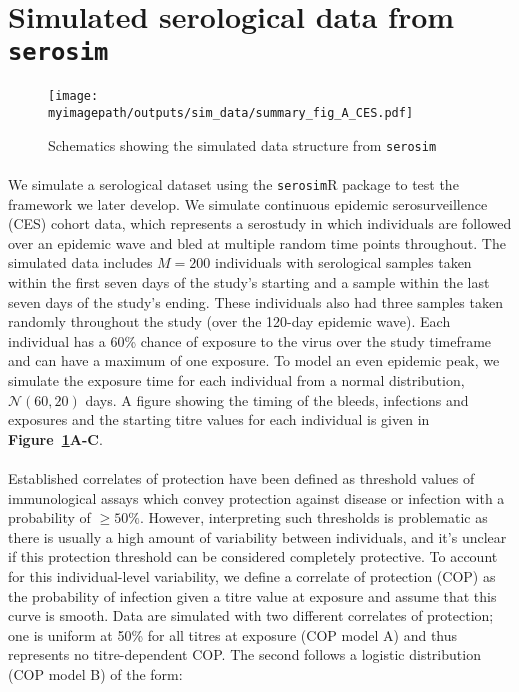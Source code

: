 \newpage
\section{Simulated serological data from \texttt{serosim}\cite{Menezes2023-ti}}

\begin{figure}[H]
    \centering
    \texttt{[image: \\myimagepath/outputs/sim\_data/summary\_fig\_A\_CES.pdf]}     \caption{Schematics showing the simulated data structure from \texttt{serosim}\cite{Menezes2023-ti}     \label{fig:sim_A}}

\end{figure}

\paragraph{}We simulate a serological dataset using the \texttt{serosim}R package\cite{Menezes2023-ti}  to test the framework we later develop. We simulate continuous epidemic serosurveillence (CES) cohort data, which represents a serostudy in which individuals are followed over an epidemic wave and bled at multiple random time points throughout. The simulated data includes $M = 200$ individuals with serological samples taken within the first seven days of the study's starting and a sample within the last seven days of the study's ending. These individuals also had three samples taken randomly throughout the study (over the 120-day epidemic wave). Each individual has a 60\% chance of exposure to the virus over the study timeframe and can have a maximum of one exposure.
 To model an even epidemic peak, we simulate the exposure time for each individual from a normal distribution, $\mathcal{N}(60, 20)$ days. A figure showing the timing of the bleeds, infections and exposures and the starting titre values for each individual is given in \textbf{Figure~\ref{fig:sim_A}A-C}.

\paragraph{}Established correlates of protection have been defined as threshold values of immunological assays which convey protection against disease or infection with a probability of $\geq 50\%$. However, interpreting such thresholds is problematic as there is usually a high amount of variability between individuals, and it's unclear if this protection threshold can be considered completely protective. To account for this individual-level variability, we define a correlate of protection (COP) as the probability of infection given a titre value at exposure and assume that this curve is smooth.
Data are simulated with two different correlates of protection; one is uniform at 50\% for all titres at exposure (COP model A) and thus represents no titre-dependent COP. The second follows a logistic distribution (COP model B) of the form:

